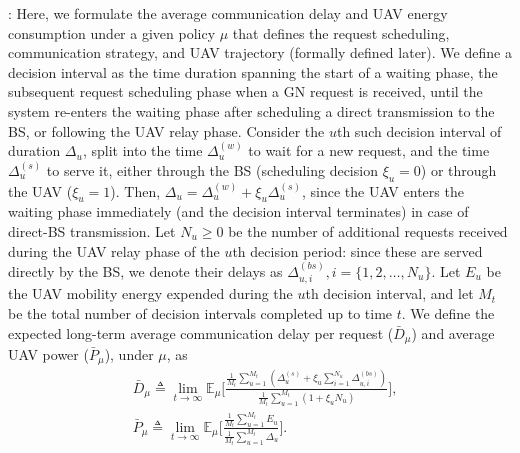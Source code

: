 \documentclass[10pt, twocolumn]{IEEEtran}
\theoremstyle{plain}
\theoremstyle{definition}
\theoremstyle{remark}
\begin{document}
: Here, we formulate the average communication delay and UAV energy consumption under a given policy $\mu$ that defines the request scheduling, communication strategy, and UAV trajectory (formally defined later). We define a decision interval as the time duration spanning the start of a waiting phase, the subsequent {request scheduling} phase when a GN request is received, until the system re-enters the waiting phase after scheduling a direct transmission to the BS, or following the {UAV relay} phase. Consider the $u$th such decision interval of duration $\Delta_{u}$, split into the time $\Delta_{u}^{(w)}$ to wait for a new request, and the time $\Delta_{u}^{(s)}$ to serve it, either through the BS (scheduling decision $\xi_{u}{=}0$) or through the UAV ($\xi_{u}{=}1$). Then, $\Delta_{u}{=}\Delta_{u}^{(w)}{+}\xi_{u}\Delta_{u}^{(s)}$, since the UAV enters the {waiting phase} immediately (and the decision interval terminates) in case of direct-BS transmission. Let $N_{u}{\geq}0$ be the number of additional requests received during the UAV relay phase of the $u$th decision period: since these are served directly by the BS, we denote their delays as $\Delta_{u,i}^{(bs)},i{=}\{1,2,{\dots},N_{u}\}$. Let $E_{u}$ be the UAV mobility energy expended during the $u$th decision interval, and let $M_{t}$ be the total number of decision intervals completed up to time $t$. We define the expected long-term average communication delay per request ($\bar{D}_{\mu}$) and average UAV power ($\bar{P}_{\mu}$), under $\mu$, as
\begin{align}\label{eq:DBarMu}
    &\bar{D}_{\mu} \triangleq \lim_{t \rightarrow \infty} \mathbb{E}_{\mu} \Bigg[\frac{\frac{1}{M_t}\sum_{u=1}^{M_t}(\Delta_u^{(s)} + \xi_u\sum_{i=1}^{N_u}\Delta_{u, i}^{(bs)})}{\frac{1}{M_t}\sum_{u=1}^{M_t}(1 + \xi_u N_u)}\Bigg],\\
    &\bar{P}_{\mu} \triangleq \lim_{t \rightarrow \infty} \mathbb{E}_{\mu} \Bigg[ \frac{\frac{1}{M_t}\sum_{u=1}^{M_t}E_u}{\frac{1}{M_t}\sum_{u=1}^{M_t}\Delta_u}\Bigg].
\end{align}
\end{document}
